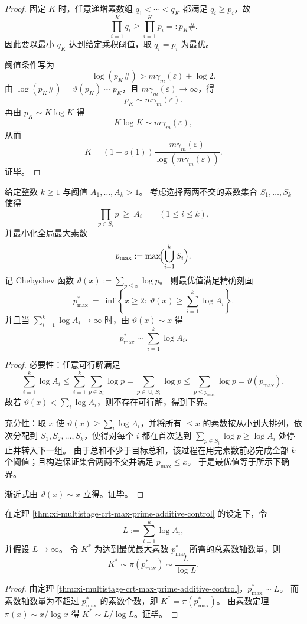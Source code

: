 \begin{proof}
固定 \(K\) 时，任意递增素数组 \(q_1<\cdots<q_K\) 都满足 \(q_i\ge p_i\)，故
\[
\prod_{i=1}^{K}q_i\ge \prod_{i=1}^{K}p_i=:p_K\#.
\]
因此要以最小 \(q_K\) 达到给定乘积阈值，取 \(q_i=p_i\) 为最优。

阈值条件写为
\[
\log(p_K\#)>m\gamma_m(\varepsilon)+\log 2.
\]
由 \(\log(p_K\#)=\vartheta(p_K)\sim p_K\)，且 \(m\gamma_m(\varepsilon)\to\infty\)，得
\[
p_K\sim m\gamma_m(\varepsilon).
\]
再由 \(p_K\sim K\log K\) 得
\[
K\log K\sim m\gamma_m(\varepsilon),
\]
从而
\[
K=
\left(1+o(1)\right)\frac{m\gamma_m(\varepsilon)}{\log(m\gamma_m(\varepsilon))}.
\]
证毕。
\end{proof}

\begin{theorem}\label{thm:xi-multistage-crt-max-prime-additive-control}
给定整数 \(k\ge 1\) 与阈值 \(A_1,\dots,A_k>1\)。
考虑选择两两不交的素数集合 \(S_1,\dots,S_k\) 使得
\[
\prod_{p\in S_i}p\ \ge\ A_i\qquad(1\le i\le k),
\]
并最小化全局最大素数
\[
p_{\max}:=\max\!\Bigl(\bigcup_{i=1}^{k}S_i\Bigr).
\]
记 Chebyshev 函数
\(
\vartheta(x):=\sum_{p\le x}\log p
\)。
则最优值满足精确刻画
\[
\boxed{\;
p_{\max}^{\ast}
\ =\
\inf\!\left\{x\ge 2:\ \vartheta(x)\ge \sum_{i=1}^{k}\log A_i\right\}.
\;}
\]
并且当 \(\sum_{i=1}^{k}\log A_i\to\infty\) 时，由 \(\vartheta(x)\sim x\) 得
\[
p_{\max}^{\ast}\sim \sum_{i=1}^{k}\log A_i.
\]
\end{theorem}
\begin{proof}
必要性：任意可行解满足
\[
\sum_{i=1}^{k}\log A_i
\le
\sum_{i=1}^{k}\sum_{p\in S_i}\log p
=
\sum_{p\in\cup_i S_i}\log p
\le
\sum_{p\le p_{\max}}\log p
=\vartheta(p_{\max}),
\]
故若 \(\vartheta(x)<\sum_i\log A_i\)，则不存在可行解，得到下界。
\par
充分性：取 \(x\) 使 \(\vartheta(x)\ge\sum_i\log A_i\)，并将所有 \(\le x\) 的素数按从小到大排列，依次分配到 \(S_1,S_2,\dots,S_k\)，使得对每个 \(i\) 都在首次达到
\(\sum_{p\in S_i}\log p\ge \log A_i\)
处停止并转入下一组。
由于总和不少于目标总和，该过程在用完素数前必完成全部 \(k\) 个阈值；且构造保证集合两两不交并满足 \(p_{\max}\le x\)。
于是最优值等于所示下确界。
\par
渐近式由 \(\vartheta(x)\sim x\) 立得。证毕。
\end{proof}

\begin{corollary}[多级阈值下的素数轴数量标度]\label{cor:xi-multistage-crt-axis-count-scaling}
在定理 \ref{thm:xi-multistage-crt-max-prime-additive-control} 的设定下，令
\[
L:=\sum_{i=1}^{k}\log A_i,
\]
并假设 \(L\to\infty\)。
令 \(K^\ast\) 为达到最优最大素数 \(p_{\max}^\ast\) 所需的总素数轴数量，则
\[
K^\ast\sim \pi(p_{\max}^\ast)\sim \frac{L}{\log L}.
\]
\end{corollary}
\begin{proof}
由定理 \ref{thm:xi-multistage-crt-max-prime-additive-control}，\(p_{\max}^\ast\sim L\)。
而素数轴数量为不超过 \(p_{\max}^\ast\) 的素数个数，即 \(K^\ast=\pi(p_{\max}^\ast)\)。
由素数定理 \(\pi(x)\sim x/\log x\) 得 \(K^\ast\sim L/\log L\)。证毕。
\end{proof}

